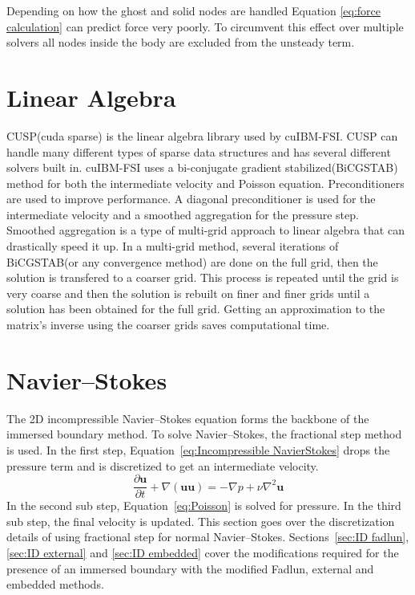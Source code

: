 \documentclass[onehalf,11pt]{beavtex}
\begin{document}
Depending on how the ghost and solid nodes are handled Equation \eqref{eq:force calculation} can predict force very poorly.
To circumvent this effect over multiple solvers all nodes inside the body are excluded from the unsteady term.

\section{Linear Algebra}
\label{Preconditioning and Linear Algebra Solvers}
CUSP(cuda sparse) is the linear algebra library used by cuIBM-FSI. 
CUSP can handle many different types of sparse data structures and has several different solvers built in. 
cuIBM-FSI uses a bi-conjugate gradient stabilized(BiCGSTAB) method for both the intermediate velocity and Poisson equation. 
Preconditioners are used to improve performance. 
A diagonal preconditioner is used for the intermediate velocity and a smoothed aggregation for the pressure step. 
Smoothed aggregation is a type of multi-grid approach to linear algebra that can drastically speed it up. 
In a multi-grid method, several iterations of BiCGSTAB(or any convergence method) are done on the full grid, then the solution is transfered to a coarser grid. 
This process is repeated until the grid is very coarse and then the solution is rebuilt on finer and finer grids until a solution has been obtained for the full grid. 
Getting an approximation to the matrix's inverse using the coarser grids saves computational time. 
\section{Navier--Stokes}
\label{ID:Navier Stokes}

The 2D incompressible Navier--Stokes equation forms the backbone of the immersed boundary method. 
To solve Navier--Stokes, the fractional step method is used. 
In the first step, Equation~\eqref{eq:Incompressible NavierStokes} drops the pressure term and is discretized to get an intermediate velocity. 
\begin{equation}
\frac{\partial \textbf{u}}{\partial t} + \nabla ( \textbf{uu} ) = -\nabla p + \nu\nabla^{2}\textbf{u} \label{eq:Incompressible NavierStokes}
\end{equation}
In the second sub step, Equation~\eqref{eq:Poisson} is solved for pressure. 
In the third sub step, the final velocity is updated. 
This section goes over the discretization details of using fractional step for normal Navier--Stokes. 
Sections~\ref{sec:ID fadlun}, \ref{sec:ID external} and \ref{sec:ID embedded} cover the modifications required for the presence of an immersed boundary with the modified Fadlun, external and embedded methods. 
\end{document}

